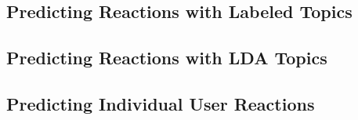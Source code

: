 
%

\subsection{Predicting Reactions with Labeled Topics}


\subsection{Predicting Reactions with LDA Topics}


\subsection{Predicting Individual User Reactions}


